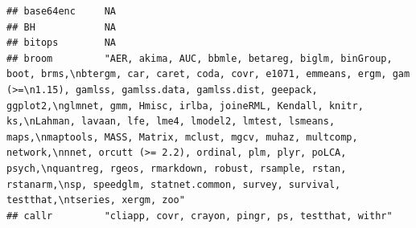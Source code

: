 \documentclass[]{article}
\begin{document}
\begin{verbatim}
## base64enc     NA                                                                                                                                                                                                                                                                                                                                                                                                                                                                                                                                                                                        
## BH            NA                                                                                                                                                                                                                                                                                                                                                                                                                                                                                                                                                                                        
## bitops        NA                                                                                                                                                                                                                                                                                                                                                                                                                                                                                                                                                                                        
## broom         "AER, akima, AUC, bbmle, betareg, biglm, binGroup, boot, brms,\nbtergm, car, caret, coda, covr, e1071, emmeans, ergm, gam (>=\n1.15), gamlss, gamlss.data, gamlss.dist, geepack, ggplot2,\nglmnet, gmm, Hmisc, irlba, joineRML, Kendall, knitr, ks,\nLahman, lavaan, lfe, lme4, lmodel2, lmtest, lsmeans, maps,\nmaptools, MASS, Matrix, mclust, mgcv, muhaz, multcomp, network,\nnnet, orcutt (>= 2.2), ordinal, plm, plyr, poLCA, psych,\nquantreg, rgeos, rmarkdown, robust, rsample, rstan, rstanarm,\nsp, speedglm, statnet.common, survey, survival, testthat,\ntseries, xergm, zoo"
## callr         "cliapp, covr, crayon, pingr, ps, testthat, withr"                                                                                                                                                                                                                                                                                                                                                                                                                                                                                                                                        

\end{verbatim}
\end{document}
